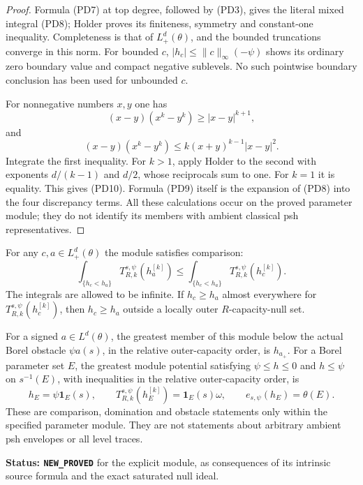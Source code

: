 \begin{proof}
Formula (PD7) at top degree, followed by (PD3), gives
the literal mixed integral (PD8); Holder proves its
finiteness, symmetry and constant-one inequality.
Completeness is that of $L^d_+(\theta)$, and the bounded
truncations converge in this norm. For bounded $c$,
$|h_c|\leq\|c\|_\infty(-\psi)$ shows its ordinary
zero boundary value and compact negative sublevels.
No such pointwise boundary conclusion has been used
for unbounded $c$.

For nonnegative numbers $x,y$ one has
\[
 (x-y)(x^k-y^k)\geq |x-y|^{k+1},
\]
and
\[
 (x-y)(x^k-y^k)\leq
                  k(x+y)^{k-1}|x-y|^2.
\]
Integrate the first inequality. For $k>1$, apply Holder
to the second with exponents $d/(k-1)$ and $d/2$, whose
reciprocals sum to one. For $k=1$ it is equality.
This gives (PD10). Formula (PD9) itself is the expansion
of (PD8) into the four discrepancy terms. All these
calculations occur on the proved parameter module;
they do not identify its members with ambient classical
psh representatives.
\end{proof}

\begin{proposition}
\label{prop:r12-parameter-comparison-domination}
For any $c,a\in L^d_+(\theta)$ the module satisfies comparison:
\[
 \int_{\{h_c<h_a\}} T^{s,\psi}_{R,k}(h_a^{[k]})
       \leq
 \int_{\{h_c<h_a\}} T^{s,\psi}_{R,k}(h_c^{[k]}).
 \tag{PD10a}
\]
The integrals are allowed to be infinite. If
$h_c\geq h_a$ almost everywhere for
$T^{s,\psi}_{R,k}(h_c^{[k]})$, then $h_c\geq h_a$
outside a locally outer $R$-capacity-null set.

For a signed $a\in L^d(\theta)$, the greatest member of this
module below the actual Borel obstacle $\psi a(s)$, in the
relative outer-capacity order, is
$h_{a_+}$. For a Borel parameter set $E$, the greatest module
potential satisfying $\psi\leq h\leq0$ and $h\leq\psi$ on
$s^{-1}(E)$, with inequalities in the relative outer-capacity
order, is
\[
             h_E=\psi\mathbf1_E(s),\qquad
             T^{s,\psi}_{R,k}(h_E^{[k]})=\mathbf1_E(s)\omega,
             \qquad e_{s,\psi}(h_E)=\theta(E).
 \tag{PD10b}
\]
These are comparison, domination and obstacle statements only
within the specified parameter module. They are not statements
about arbitrary ambient psh envelopes or all level traces.
\end{proposition}

\noindent\textbf{Status: \texttt{NEW\_PROVED}} for the explicit
module, as consequences of its intrinsic source formula and
the exact saturated null ideal.

